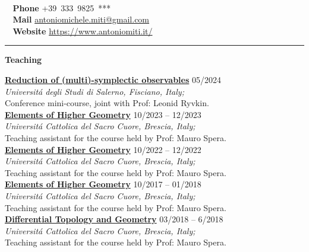 \documentclass[a4paper]{article}
\newcommand{\block}[1]{\hrule \vspace{0.2cm} \textbf{\Large #1} \vspace{0.2cm}}
\newcommand{\voice}[5]{\href{#4}{\textbf{#1}} \hfill #2 \\ \textit{#3} \\ {\small #5} \vspace{0.2cm} \\}
\newcommand{\skill}[2]{\textbf{#1} \hfill #2 \\}
\begin{document}
\begin{minipage}[c]{0.6\columnwidth}
    \\
\end{minipage} 
\hfill
\begin{minipage}[t]{0.375\columnwidth}
    \skill{\faPhone~ Phone}{+39~333~9825~***}
    \skill{\faEnvelope~ Mail}{\href{mailto:antoniomichele.miti@gmail.com}{antoniomichele.miti@gmail.com}}
    \skill{\faGlobe~ Website}{\href{https://www.antoniomiti.it/}{https://www.antoniomiti.it/}}
\end{minipage}
\vspace{-0.25em}

 

\vspace{1em}

    \block{Teaching}

    
    \voice{Reduction of (multi)-symplectic observables}
        {05/2024}
        {Universit\'a degli Studi di Salerno, Fisciano, Italy;}
        {https://www.antoniomiti.it/teaching/Obs-Constraint-2024/}       
        {Conference mini-course, joint with Prof: Leonid Ryvkin.}
    \voice{Elements of Higher Geometry}
        {10/2023 -- 12/2023}
        {Universit\'a Cattolica del Sacro Cuore, Brescia, Italy;}
        {https://dmf.unicatt.it/miti/teaching/IstGeoSup-22-23/}       
        {Teaching assistant for the course held by Prof: Mauro Spera.}
    \voice{Elements of Higher Geometry}
        {10/2022 -- 12/2022}
        {Universit\'a Cattolica del Sacro Cuore, Brescia, Italy;}
        {https://dmf.unicatt.it/miti/teaching/IstGeoSup-22-23/}       
        {Teaching assistant for the course held by Prof: Mauro Spera.}
    \voice{Elements of Higher Geometry}
        {10/2017 -- 01/2018}
        {Universit\'a Cattolica del Sacro Cuore, Brescia, Italy;}
        {http://docenti.unicatt.it/web/html/index.html\#/programmi/BS/2D9B/75017/2017/21065/MIH341/ita}       
        {Teaching assistant for the course held by Prof: Mauro Spera.}
    \voice{Differential Topology and Geometry}
        {03/2018 -- 6/2018}
        {Universit\'a Cattolica del Sacro Cuore, Brescia, Italy;}
        {http://docenti.unicatt.it/web/html/index.html\#/programmi/BS/2D8B/75017/2017/21065/MGH344/ita}       
        {Teaching assistant for the course held by Prof: Mauro Spera.}

        
\end{document}
